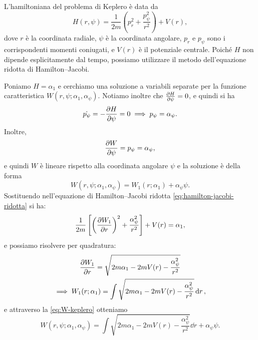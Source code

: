 \begin{example} 
    L'hamiltoniana del problema di Keplero è data da
    \begin{equation*}
        H(r, \psi) = \frac{1}{2m}\left(p_r^2 + \frac{p_\psi^2}{r^2}\right) +V(r),
    \end{equation*}
    dove $r$ è la coordinata radiale, $\psi$ è la coordinata angolare, $p_r$ e $p_\psi$ sono i corrispondenti momenti coniugati, e $V(r)$ è il potenziale centrale. Poiché $H$ non dipende esplicitamente dal tempo, possiamo utilizzare il metodo dell'equazione ridotta di Hamilton--Jacobi.

    Poniamo $H=\alpha_1$ e cerchiamo una soluzione a variabili separate per la funzione caratteristica $W(r, \psi; \alpha_1, \alpha_\psi)$. Notiamo inoltre che $\pdv{H}{\psi} = 0$, e quindi si ha
    \begin{equation*}
        \dot{p_\psi} = -\pdv{H}{\psi} = 0 \implies p_\psi = \alpha_\psi.
    \end{equation*}
    Inoltre,
    \begin{equation*}
        \pdv{W}{\psi} = p_\psi = \alpha_\psi,
    \end{equation*}
    e quindi $W$ è lineare rispetto alla coordinata angolare $\psi$ e la soluzione è della forma
    \begin{equation}
        \label{eq:W-keplero}
        W(r, \psi; \alpha_1, \alpha_\psi) = W_1(r; \alpha_1) + \alpha_\psi \psi.
    \end{equation}
    Sostituendo nell'equazione di Hamilton--Jacobi ridotta \eqref{eq:hamilton-jacobi-ridotta} si ha:
    \begin{equation*}
        \frac{1}{2m}\left[ \left( \pdv{W_1}{r} \right)^2 + \frac{\alpha_\psi^2}{r^2} \right] + V(r) = \alpha_1,
    \end{equation*}
    e possiamo risolvere per quadratura:
    \begin{gather*}
        \pdv{W_1}{r} = \sqrt{2m\alpha_1 - 2mV(r) - \frac{\alpha_\psi^2}{r^2}} \\
        \implies W_1(r; \alpha_1) = \int \sqrt{2m\alpha_1 - 2mV(r) - \frac{\alpha_\psi^2}{r^2}} \dd{r},
    \end{gather*}
    e attraverso la \eqref{eq:W-keplero} otteniamo
    \begin{equation*}
        W(r, \psi; \alpha_1, \alpha_\psi) = \int \sqrt{2m\alpha_1 - 2mV(r) - \frac{\alpha_\psi^2}{r^2}} \dd{r} + \alpha_\psi \psi.
    \end{equation*}
    

\end{example}
